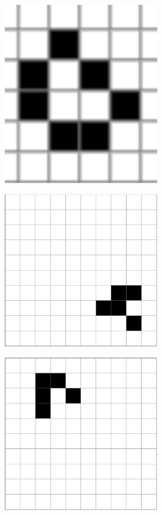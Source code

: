 \documentclass[12pt] {article}
\begin{document}
\begin{figure}[H]
    \begin{minipage}[t]{.3\textwidth}
        \centering
        \includegraphics[width=0.6\textwidth]{res/bochenek.png}
        \label{fig:o1}
    \end{minipage}
    \hfill
    \begin{minipage}[t]{.3\textwidth}
        \centering
        \includegraphics[width=0.6\textwidth]{res/glider1.png}
        \label{fig:o2}
    \end{minipage}
    \hfill
    \begin{minipage}[t]{.3\textwidth}
        \centering
        \includegraphics[width=0.6\textwidth]{res/glider2.png}

\end{minipage}
\end{figure}
\end{document}
